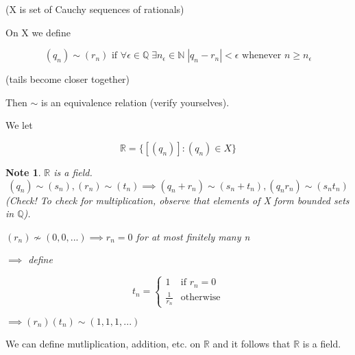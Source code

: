 \documentclass[11pt, oneside]{book}
\theoremstyle{break}
\newtheorem*{note}{Note}
\newcommand{\bb}[1]{\mathbb{#1}}			%
\begin{document}
(X is set of Cauchy sequences of rationals)

On X we define

\begin{equation}
	(q_n) \sim (r_n) \text{ if } \forall \epsilon \in \bb{Q} \; \exists n_\epsilon \in \bb{N} \; |q_n - r_n| < \epsilon \text{ whenever } n \geq n_\epsilon
\end{equation}

(tails become closer together)

Then $\sim$ is an equivalence relation (verify yourselves).

We let 

\begin{equation}
	\bb{R} = \{[(q_n)] : (q_n) \in X\}
\end{equation}

\begin{note}
	$\bb{R}$ is a field.
	\begin{equation}
		(q_n) \sim (s_n), (r_n) \sim (t_n) \implies (q_n + r_n) \sim (s_n + t_n), (q_n r_n) \sim (s_n t_n)
	\end{equation}
	(Check! To check for multiplication, observe that elements of X form bounded sets in $\bb{Q}$).

	$(r_n) \nsim (0, 0, ...) \implies r_n = 0$ for at most finitely many n

	$\implies$ define

	\[
	t_n =
	\begin{cases}
		1 				& \text{if } r_n = 0 \\
		\frac{1}{r_n} 	& \text{otherwise}
	\end{cases}
	\]

	$\implies (r_n)(t_n) \sim (1, 1, 1, ...)$
\end{note}

We can define mutliplication, addition, etc. on $\bb{R}$ and it follows that $\bb{R}$ is a field.
\end{document}
